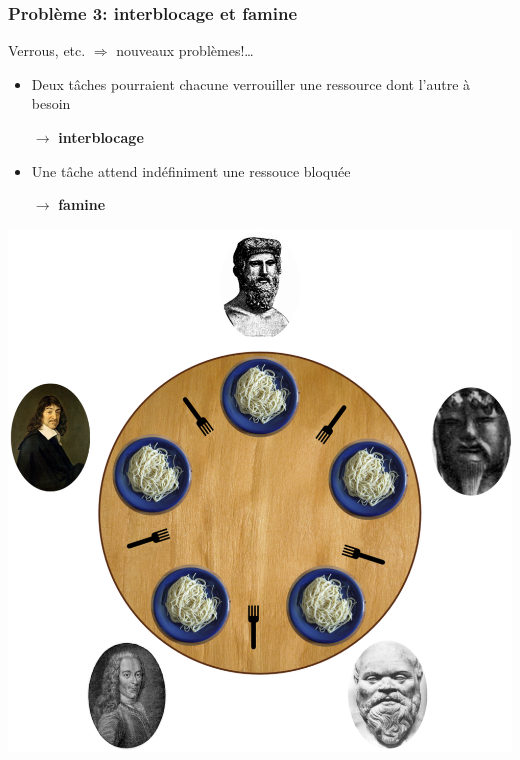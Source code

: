 \documentclass{beamer}
\begin{document}
\begin{frame}[containsverbatim]{Solution 3: \textbf{moniteur} (Hoare / Brinch-Hansen)}
\begin{lstlisting}[language=Java]
public class SynchronizedCounter {
  private int c = 0;

  public synchronized void increment() {
    c++;
  }

  public synchronized void decrement() {
    c--;
  }

  public synchronized int value() {
    return c;
  }
}
\end{lstlisting}}
\end{frame} %
\begin{frame}
  \frametitle{Problème 3: \textbf{interblocage} et \textbf{famine}}
  \begin{minipage}{.55\textwidth}
    Verrous, etc. $\Rightarrow$ nouveaux problèmes!\ldots
    \bigskip
    \begin{itemize}
     \item Deux tâches pourraient chacune verrouiller une ressource dont l'autre
       à besoin\par
       $\rightarrow$ \textbf{interblocage}
     \item Une tâche attend indéfiniment une ressouce bloquée\par
       $\rightarrow$ \textbf{famine}
    \end{itemize}
  \end{minipage}
  \;\;
  \begin{minipage}{.39\textwidth}
    \includegraphics[width=.7\textwidth]{philosophes.png}
  \end{minipage}
\end{frame} %
\end{document}
